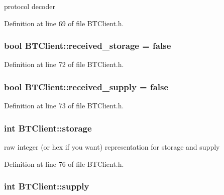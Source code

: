protocol decoder 



Definition at line 69 of file B\-T\-Client.\-h.

\hypertarget{classBTClient_a41a7d3382ab8bbdf4b7d78b7b69ff85f}{
\subsubsection[{received\-\_\-storage}]{\setlength{\rightskip}{0pt plus 5cm}bool B\-T\-Client\-::received\-\_\-storage = false\hspace{0.3cm}{\ttfamily [private]}}}\label{classBTClient_a41a7d3382ab8bbdf4b7d78b7b69ff85f}


Definition at line 72 of file B\-T\-Client.\-h.

\hypertarget{classBTClient_af00b18b695ecc4bdeea133572eb0fd6d}{
\subsubsection[{received\-\_\-supply}]{\setlength{\rightskip}{0pt plus 5cm}bool B\-T\-Client\-::received\-\_\-supply = false\hspace{0.3cm}{\ttfamily [private]}}}\label{classBTClient_af00b18b695ecc4bdeea133572eb0fd6d}


Definition at line 73 of file B\-T\-Client.\-h.

\hypertarget{classBTClient_a5ba419e7e6be73f5ec26f6b6c8d4ccf1}{
\subsubsection[{storage}]{\setlength{\rightskip}{0pt plus 5cm}int B\-T\-Client\-::storage\hspace{0.3cm}{\ttfamily [private]}}}\label{classBTClient_a5ba419e7e6be73f5ec26f6b6c8d4ccf1}


raw integer (or hex if you want) representation for storage and supply 



Definition at line 76 of file B\-T\-Client.\-h.

\hypertarget{classBTClient_a3974a28859432eeef27cfd7391ed7d60}{
\subsubsection[{supply}]{\setlength{\rightskip}{0pt plus 5cm}int B\-T\-Client\-::supply\hspace{0.3cm}{\ttfamily [private]}}}\label{classBTClient_a3974a28859432eeef27cfd7391ed7d60}



